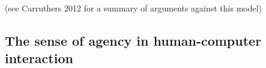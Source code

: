 (see Carruthers 2012 for a summary of arguments against this model)






\subsection{The sense of agency in human-computer interaction}
